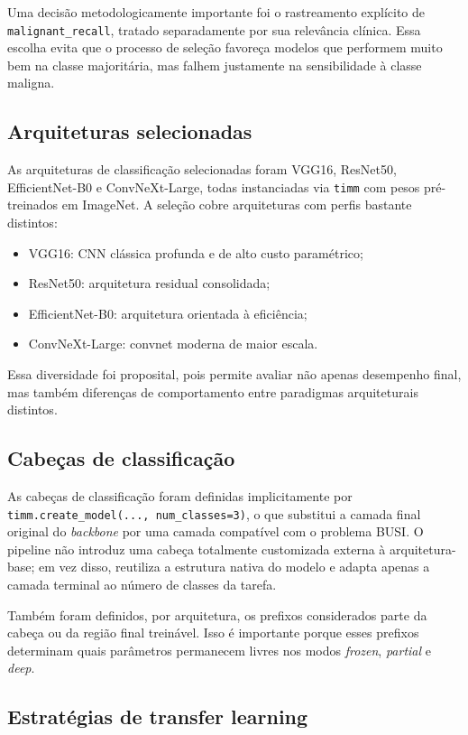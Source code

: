 \documentclass[tcc,capa]{texufpel}
\begin{document}
Uma decisão metodologicamente importante foi o rastreamento explícito de \texttt{malignant\_recall}, tratado separadamente por sua relevância clínica. Essa escolha evita que o processo de seleção favoreça modelos que performem muito bem na classe majoritária, mas falhem justamente na sensibilidade à classe maligna.

\subsection{Arquiteturas selecionadas}

As arquiteturas de classificação selecionadas foram VGG16, ResNet50, EfficientNet-B0 e ConvNeXt-Large, todas instanciadas via \texttt{timm} com pesos pré-treinados em ImageNet. A seleção cobre arquiteturas com perfis bastante distintos:
\begin{itemize}
	\item VGG16: CNN clássica profunda e de alto custo paramétrico;
	\item ResNet50: arquitetura residual consolidada;
	\item EfficientNet-B0: arquitetura orientada à eficiência;
	\item ConvNeXt-Large: convnet moderna de maior escala.
\end{itemize}

Essa diversidade foi proposital, pois permite avaliar não apenas desempenho final, mas também diferenças de comportamento entre paradigmas arquiteturais distintos.

\subsection{Cabeças de classificação}

As cabeças de classificação foram definidas implicitamente por \texttt{timm.create\_model(..., num\_classes=3)}, o que substitui a camada final original do \textit{backbone} por uma camada compatível com o problema BUSI. O pipeline não introduz uma cabeça totalmente customizada externa à arquitetura-base; em vez disso, reutiliza a estrutura nativa do modelo e adapta apenas a camada terminal ao número de classes da tarefa.

Também foram definidos, por arquitetura, os prefixos considerados parte da cabeça ou da região final treinável. Isso é importante porque esses prefixos determinam quais parâmetros permanecem livres nos modos \textit{frozen}, \textit{partial} e \textit{deep}.

\subsection{Estratégias de transfer learning}
\end{document}
